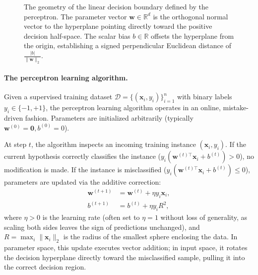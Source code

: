 \begin{figure}[H]
\caption{The geometry of the linear decision boundary defined by the perceptron. The parameter vector $\mathbf{w} \in \mathbb{R}^d$ is the orthogonal normal vector to the hyperplane pointing directly toward the positive decision half-space. The scalar bias $b \in \mathbb{R}$ offsets the hyperplane from the origin, establishing a signed perpendicular Euclidean distance of $\frac{|b|}{\|\mathbf{w}\|_2}$.}
\label{fig:hyperplane_geometry}
\end{figure}

\paragraph{The perceptron learning algorithm.}
Given a supervised training dataset $\mathcal{D} = \{(\mathbf{x}_i, y_i)\}_{i=1}^n$ with binary labels $y_i \in \{-1, +1\}$, the perceptron learning algorithm operates in an online, mistake-driven fashion. Parameters are initialized arbitrarily (typically $\mathbf{w}^{(0)} = \mathbf{0}, b^{(0)} = 0$).

At step $t$, the algorithm inspects an incoming training instance $(\mathbf{x}_i, y_i)$. If the current hypothesis correctly classifies the instance ($y_i (\mathbf{w}^{(t)\top} \mathbf{x}_i + b^{(t)}) > 0$), no modification is made. If the instance is misclassified ($y_i (\mathbf{w}^{(t)\top} \mathbf{x}_i + b^{(t)}) \le 0$), parameters are updated via the additive correction:
\begin{align}
\mathbf{w}^{(t+1)} &= \mathbf{w}^{(t)} + \eta y_i \mathbf{x}_i, \label{eq:perceptron_update_w} \\
b^{(t+1)} &= b^{(t)} + \eta y_i R^2, \label{eq:perceptron_update_b}
\end{align}
where $\eta > 0$ is the learning rate (often set to $\eta = 1$ without loss of generality, as scaling both sides leaves the sign of predictions unchanged), and $R = \max_i \|\mathbf{x}_i\|_2$ is the radius of the smallest sphere enclosing the data. In parameter space, this update executes vector addition; in input space, it rotates the decision hyperplane directly toward the misclassified sample, pulling it into the correct decision region.


